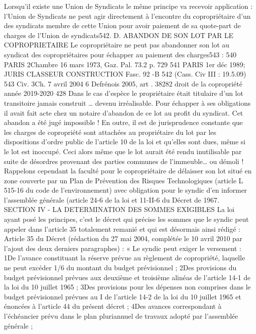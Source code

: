 Lorsqu’il existe une Union de Syndicats le même principe va recevoir application : l’Union de Syndicats ne peut agir directement à l’encontre du copropriétaire d’un des syndicats membre de cette Union pour avoir paiement de sa quote-part de charges de l’Union de syndicats542.
D. ABANDON DE SON LOT PAR LE COPROPRIETAIRE
Le copropriétaire ne peut pas abandonner son lot au syndicat des copropriétaires pour échapper au paiement des charges543 :
540 PARIS 2\degres Chambre 16 mars 1973, Gaz. Pal. 73.2 p. 729
541 PARIS 1er déc 1989; JURIS CLASSEUR CONSTRUCTION Fasc. 92 -B 
542 (Cass. Civ III : 19.5.09)
543 Civ. 3\degres Ch. 7 avril 2004 6 Defrénois 2005, art . 38282
droit de la copropriété année 2019-2020
428
Dans le cas d’espèce le propriétaire était titulaire d’un lot transitoire jamais construit … devenu irréalisable. Pour échapper à ses obligations il avait fait acte chez un notaire d’abandon de ce lot au profit du syndicat. Cet abandon a été jugé impossible !
En outre, il est de jurisprudence constante que les charges de copropriété sont attachées au propriétaire du lot par les dispositions d'ordre public de l'article 10 de la loi et qu'elles sont dues, même si le lot est inoccupé.
Ceci alors même que le lot aurait été rendu inutilisable par suite de désordres provenant des parties communes de l'immeuble… ou démoli !
Rappelons cependant la faculté pour le copropriétaire de délaisser son lot situé en zone couverte par un Plan de Prévention des Risques Technologiques (article L 515-16 du code de l’environnement) avec obligation pour le syndic d’en informer l’assemblée générale (article 24-6 de la loi et 11-II-6 du Décret de 1967.
SECTION IV - LA DETERMINATION DES SOMMES EXIGIBLES
La loi ayant posé les principes, c’est le décret qui précise les sommes que le syndic peut appeler dans l’article 35 totalement remanié et qui est désormais ainsi rédigé :
Article 35 du Décret (rédaction du 27 mai 2004, complétée le 10 avril 2010 par l’ajout des deux derniers paragraphes) :
« Le syndic peut exiger le versement :
1\degres De l'avance constituant la réserve prévue au règlement de copropriété, laquelle ne peut excéder 1/6 du montant du budget prévisionnel ;
2\degres Des provisions du budget prévisionnel prévues aux deuxième et troisième alinéas de l'article 14-1 de la loi du 10 juillet 1965 ;
3\degres Des provisions pour les dépenses non comprises dans le budget prévisionnel prévues au I de l'article 14-2 de la loi du 10 juillet 1965 et énoncées à l'article 44 du présent décret ;
4\degres Des avances correspondant à l'échéancier prévu dans le plan pluriannuel de travaux adopté par l'assemblée générale ;
